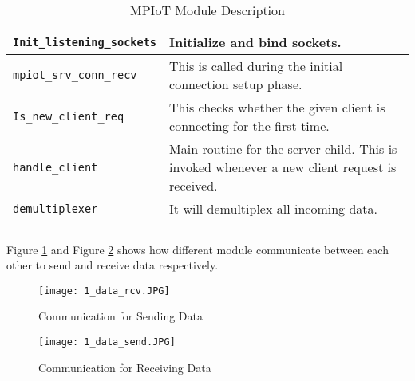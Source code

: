\begin{longtable}{ |p{5cm}||p{11cm}|  }
 \verb|Init_listening_sockets|& Initialize and bind sockets.\\ \hline
 \verb|mpiot_srv_conn_recv|& This is called during the initial connection setup phase.\\  \hline
 \verb|Is_new_client_req|& This checks whether the given client is connecting for the first time.\\  \hline
 \verb|handle_client|& Main routine for the server-child. This is invoked whenever a new client request is received.\\  \hline
 \verb|demultiplexer|& It will demultiplex all incoming data.\\
 \hline
 \caption{MPIoT Module Description }
  \label{table:module}
\end{longtable}

\paragraph{} Figure \ref{fig:1_data_rcv} and Figure \ref{fig:1_data_send} shows how different module communicate between each other to send and receive data respectively.

\begin{figure}[h]
  \centering
    \texttt{[image: 1\_data\_rcv.JPG]}
  \caption{Communication for Sending Data}
  \label{fig:1_data_rcv}
\end{figure}

\begin{figure}[h]
  \centering
    \texttt{[image: 1\_data\_send.JPG]}
  \caption{Communication for Receiving Data}
  \label{fig:1_data_send}
\end{figure}
